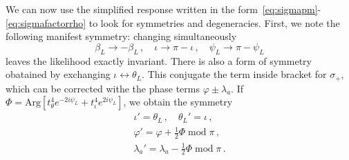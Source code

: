 \documentclass[aps,showpacs,twocolumn,prd,superscriptaddress,nofootinbib]{revtex4-1}
\newcommand{\be}{\begin{equation}}
\newcommand{\ee}{\end{equation}}
\newcommand{\nn}{\nonumber}
\newcommand\betaL{{\beta_{L}}}
\newcommand\psiL{{\psi_{L}}}
\begin{document}
We can now use the simplified response written in the form~\eqref{eq:sigmapm}-\eqref{eq:sigmafactorrho} to look for symmetries and degeneracies. First, we note the following manifest symmetry: changing simultaneously
\be\label{eq:symmetryresponse}
	\betaL \rightarrow -\betaL\,, \quad \iota \rightarrow \pi - \iota \,, \quad \psiL \rightarrow \pi - \psiL
\ee
leaves the likelihood exactly invariant. There is also a form of symmetry obatained by exchanging $\iota \leftrightarrow \theta_{L}$. This conjugate the term inside bracket for $\sigma_{+}$, which can be corrected withe the phase terms $\varphi \pm \lambda_{a}$. If $\Phi = \mathrm{Arg} \left[ t_{\theta}^{4} e^{-2 i \psiL} + t_{\iota}^{4} e^{2 i \psiL} \right]$, we obtain the symmetry
\begin{align}
	\iota' = \theta_{L} \,, \quad \theta_{L}' = \iota \,, \nn\\
	\varphi' = \varphi + \frac{1}{2} \Phi \; \mathrm{mod} \; \pi\,, \nn\\
	\lambda_{a}' = \lambda_{a} - \frac{1}{2} \Phi \; \mathrm{mod} \; \pi\,.
\end{align}
\end{document}
